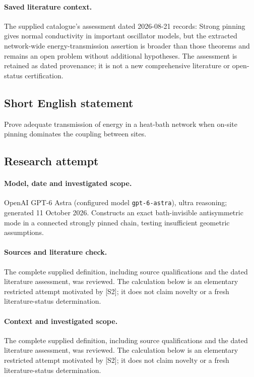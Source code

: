 \documentclass[11pt]{article}
\begin{document}
\paragraph{Saved literature context.} The supplied catalogue's assessment dated 2026-08-21 records: Strong pinning gives normal conductivity in important oscillator models, but the extracted network-wide energy-transmission assertion is broader than those theorems and remains an open problem without additional hypotheses. The assessment is retained as dated provenance; it is not a new comprehensive literature or open-status certification.
\subsection{Short English statement}
Prove adequate transmission of energy in a heat-bath network when on-site pinning dominates the coupling between sites.
\subsection{Research attempt}
\paragraph{Model, date and investigated scope.}
OpenAI GPT-6 Astra (configured model \texttt{gpt-6-astra}), ultra reasoning; generated 11 October 2026. Constructs an exact bath-invisible antisymmetric mode in a connected strongly pinned chain, testing insufficient geometric assumptions.

\paragraph{Sources and literature check.}
The complete supplied definition, including source qualifications and the dated literature assessment, was reviewed. The calculation below is an elementary restricted attempt motivated by [S2]; it does not claim novelty or a fresh literature-status determination.

\paragraph{Context and investigated scope.} The complete supplied definition, including source qualifications and the dated literature assessment, was reviewed. The calculation below is an elementary restricted attempt motivated by [S2]; it does not claim novelty or a fresh literature-status determination.
\end{document}
